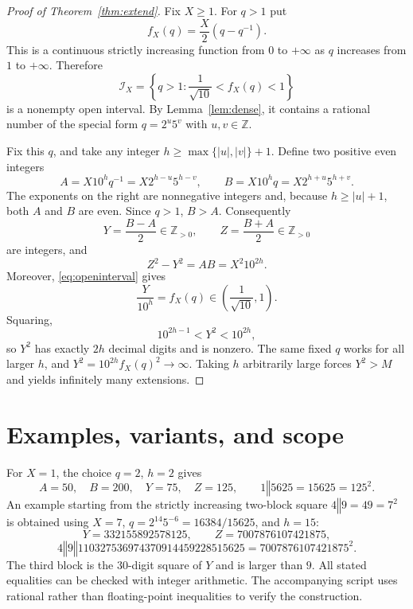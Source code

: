 \documentclass[9pt]{extarticle}
\newcommand{\cat}{\mathbin{\Vert}}
\begin{document}
\begin{proof}[Proof of Theorem~\ref{thm:extend}]
Fix $X\ge1$. For $q>1$ put
\[f_X(q)=\frac X2(q-q^{-1}).\]
This is a continuous strictly increasing function from $0$ to
$+\infty$ as $q$ increases from $1$ to $+\infty$. Therefore
\begin{equation}\label{eq:openinterval}
\mathcal I_X=\left\{q>1:\frac1{\sqrt{10}}<f_X(q)<1\right\}
\end{equation}
is a nonempty open interval. By Lemma~\ref{lem:dense}, it
contains a rational number of the special form $q=2^u5^v$
with $u,v\in\mathbb Z$.

Fix this $q$, and take any integer
$h\ge\max\{|u|,|v|\}+1$. Define two positive even integers
\begin{equation}\label{eq:factors}
 A=X10^h q^{-1}=X2^{h-u}5^{h-v},\qquad
 B=X10^h q=X2^{h+u}5^{h+v}.
\end{equation}
The exponents on the right are nonnegative integers and, because
$h\ge |u|+1$, both $A$ and $B$ are even. Since $q>1$, $B>A$.
Consequently
\begin{equation}\label{eq:yz}
 Y=\frac{B-A}{2}\in\mathbb Z_{>0},\qquad
 Z=\frac{B+A}{2}\in\mathbb Z_{>0}
\end{equation}
are integers, and
\begin{equation}\label{eq:pyth}
 Z^2-Y^2=AB=X^2 10^{2h}.
\end{equation}
Moreover, \eqref{eq:openinterval} gives
\[\frac{Y}{10^h}=f_X(q)\in\left(\frac1{\sqrt{10}},1\right).\]
Squaring,
\[10^{2h-1}<Y^2<10^{2h},\]
so $Y^2$ has exactly $2h$ decimal digits and is nonzero.
The same fixed $q$ works for all larger $h$, and
$Y^2=10^{2h}f_X(q)^2\to\infty$. Taking $h$ arbitrarily
large forces $Y^2>M$ and yields infinitely many extensions.
\end{proof}

\section{Examples, variants, and scope}
For $X=1$, the choice $q=2$, $h=2$ gives
\[
 A=50,\quad B=200,\quad Y=75,\quad Z=125,
 \qquad\boxed{1\cat5625=15625=125^2}.
\]
An example starting from the strictly increasing two-block
square $4\cat9=49=7^2$ is obtained using
$X=7$, $q=2^{14}5^{-6}=16384/15625$, and $h=15$:
\[
Y=332155892578125,\qquad Z=7007876107421875,
\]
\begin{equation}\label{eq:example}
\boxed{4\cat9\cat110327536974370914459228515625
=7007876107421875^2.}
\end{equation}
The third block is the $30$-digit square of $Y$ and is
larger than $9$. All stated equalities can be checked with
integer arithmetic. The accompanying script uses rational rather
than floating-point inequalities to verify the construction.
\end{document}
